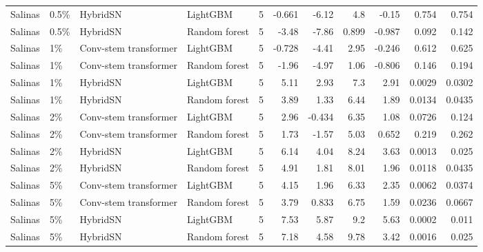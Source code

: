 \begin{table}
\begin{tabular}{llllrrrrrrr}
Salinas & 0.5\% & HybridSN & LightGBM & 5 & -0.661 & -6.12 & 4.8 & -0.15 & 0.754 & 0.754 \\
Salinas & 0.5\% & HybridSN & Random forest & 5 & -3.48 & -7.86 & 0.899 & -0.987 & 0.092 & 0.142 \\
Salinas & 1\% & Conv-stem transformer & LightGBM & 5 & -0.728 & -4.41 & 2.95 & -0.246 & 0.612 & 0.625 \\
Salinas & 1\% & Conv-stem transformer & Random forest & 5 & -1.96 & -4.97 & 1.06 & -0.806 & 0.146 & 0.194 \\
Salinas & 1\% & HybridSN & LightGBM & 5 & 5.11 & 2.93 & 7.3 & 2.91 & 0.0029 & 0.0302 \\
Salinas & 1\% & HybridSN & Random forest & 5 & 3.89 & 1.33 & 6.44 & 1.89 & 0.0134 & 0.0435 \\
Salinas & 2\% & Conv-stem transformer & LightGBM & 5 & 2.96 & -0.434 & 6.35 & 1.08 & 0.0726 & 0.124 \\
Salinas & 2\% & Conv-stem transformer & Random forest & 5 & 1.73 & -1.57 & 5.03 & 0.652 & 0.219 & 0.262 \\
Salinas & 2\% & HybridSN & LightGBM & 5 & 6.14 & 4.04 & 8.24 & 3.63 & 0.0013 & 0.025 \\
Salinas & 2\% & HybridSN & Random forest & 5 & 4.91 & 1.81 & 8.01 & 1.96 & 0.0118 & 0.0435 \\
Salinas & 5\% & Conv-stem transformer & LightGBM & 5 & 4.15 & 1.96 & 6.33 & 2.35 & 0.0062 & 0.0374 \\
Salinas & 5\% & Conv-stem transformer & Random forest & 5 & 3.79 & 0.833 & 6.75 & 1.59 & 0.0236 & 0.0667 \\
Salinas & 5\% & HybridSN & LightGBM & 5 & 7.53 & 5.87 & 9.2 & 5.63 & 0.0002 & 0.011 \\
Salinas & 5\% & HybridSN & Random forest & 5 & 7.18 & 4.58 & 9.78 & 3.42 & 0.0016 & 0.025 \\
\bottomrule
\end{tabular}
\end{table}
